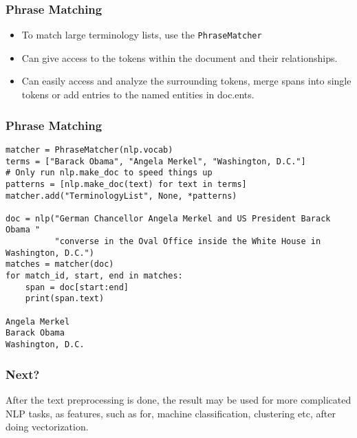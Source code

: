 \begin{frame}[fragile]\frametitle{Phrase Matching }

  \begin{itemize}
    \item To match large terminology lists, use the \lstinline|PhraseMatcher|
		\item Can give access to the tokens within the document and their relationships.
		\item Can easily access and analyze the surrounding tokens, merge spans into single tokens or add entries to the named entities in doc.ents.
  \end{itemize}
	
\end{frame}

\begin{frame}[fragile]\frametitle{Phrase Matching }

\begin{lstlisting}
matcher = PhraseMatcher(nlp.vocab)
terms = ["Barack Obama", "Angela Merkel", "Washington, D.C."]
# Only run nlp.make_doc to speed things up
patterns = [nlp.make_doc(text) for text in terms]
matcher.add("TerminologyList", None, *patterns)

doc = nlp("German Chancellor Angela Merkel and US President Barack Obama "
          "converse in the Oval Office inside the White House in Washington, D.C.")
matches = matcher(doc)
for match_id, start, end in matches:
    span = doc[start:end]
    print(span.text)
		
Angela Merkel
Barack Obama
Washington, D.C.
\end{lstlisting}


\end{frame}


\begin{frame}[fragile]
\frametitle{Next?}
 After the text preprocessing is done, the result may be used for more complicated NLP tasks, as features, such as for, machine classification, clustering etc, after doing vectorization.
\end{frame}